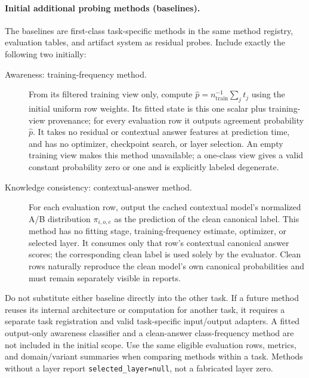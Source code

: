 \documentclass[11pt]{article}
\begin{document}
\paragraph{Initial additional probing methods (baselines).}
The baselines are first-class task-specific methods in the same method registry, evaluation tables, and artifact system as residual probes.
Include exactly the following two initially:
\begin{description}
\item[Awareness: training-frequency method.]
From its filtered training view only, compute $\widehat p=n_{\mathrm{train}}^{-1}\sum_j t_j$ using the initial uniform row weights.
Its fitted state is this one scalar plus training-view provenance; for every evaluation row it outputs agreement probability $\widehat p$.
It takes no residual or contextual answer features at prediction time, and has no optimizer, checkpoint search, or layer selection.
An empty training view makes this method unavailable; a one-class view gives a valid constant probability zero or one and is explicitly labeled degenerate.
\item[Knowledge consistency: contextual-answer method.]
For each evaluation row, output the cached contextual model's normalized A/B distribution $\pi_{i,o,e}$ as the prediction of the clean canonical label.
This method has no fitting stage, training-frequency estimate, optimizer, or selected layer.
It consumes only that row's contextual canonical answer scores; the corresponding clean label is used solely by the evaluator.
Clean rows naturally reproduce the clean model's own canonical probabilities and must remain separately visible in reports.
\end{description}
Do not substitute either baseline directly into the other task.
If a future method reuses its internal architecture or computation for another task, it requires a separate task registration and valid task-specific input/output adapters.
A fitted output-only awareness classifier and a clean-answer class-frequency method are not included in the initial scope.
Use the same eligible evaluation rows, metrics, and domain/variant summaries when comparing methods within a task.
Methods without a layer report \texttt{selected\_layer=null}, not a fabricated layer zero.
\end{document}
